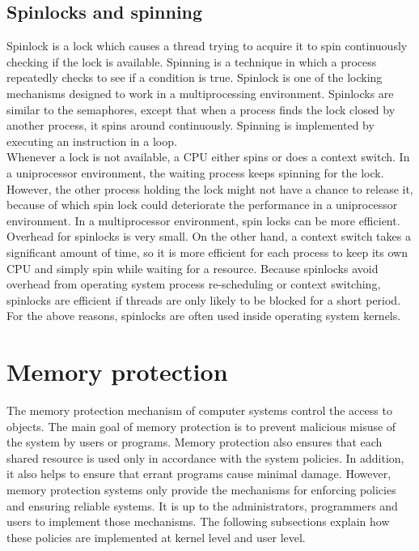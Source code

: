\subsection{Spinlocks and spinning}

Spinlock is a lock which causes a thread trying to acquire it to spin continuously checking if the lock is available. Spinning is a technique in which a process repeatedly checks to see if a condition is true. Spinlock is one of the locking mechanisms designed to work in a multiprocessing environment. Spinlocks are similar to the semaphores, except that when a process finds the lock closed by another process, it spins around continuously. Spinning is implemented by executing an instruction in a loop\cite{Bovet:2005:ULK:1077084}.
\\
Whenever a lock is not available, a CPU either spins or does a context switch. In a uniprocessor environment, the waiting process keeps spinning for the lock. However, the other process holding the lock might not have a chance to release it, because of which spin lock could deteriorate the performance in a uniprocessor environment. In a multiprocessor environment, spin locks can be more efficient. Overhead for spinlocks is very small. On the other hand, a context switch takes a significant amount of time, so it is more efficient for each process to keep its own CPU and simply spin while waiting for a resource\cite{Bovet:2005:ULK:1077084}. Because spinlocks avoid overhead from operating system process re-scheduling or context switching, spinlocks are efficient if threads are only likely to be blocked for a short period. For the above reasons, spinlocks are often used inside operating system kernels.


\pagebreak

\section{Memory protection}

The memory protection mechanism of computer systems control the access to objects. The main goal of memory protection is to prevent malicious misuse of the system by users or programs. Memory protection also ensures that each shared resource is used only in accordance with the system policies. In addition, it also helps to ensure that errant programs cause minimal damage. However, memory protection systems only provide the mechanisms for enforcing policies and ensuring reliable systems. It is up to the administrators, programmers and users to implement those mechanisms\cite{Galvin, Graham:1971:PPP:1478873.1478928}. The following subsections explain how these policies are implemented at kernel level and user level. 

